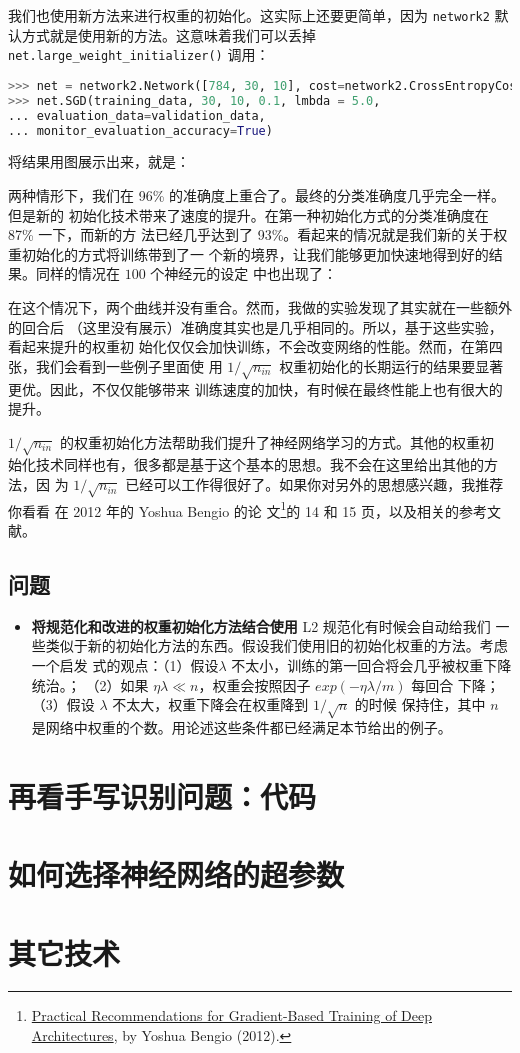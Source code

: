 我们也使用新方法来进行权重的初始化。这实际上还要更简单，因为 \lstinline!network2! 默认方式就是使用新的方法。这意味着我们可以丢掉 \lstinline!net.large_weight_initializer()! 调用：

\begin{lstlisting}[language=Python]
>>> net = network2.Network([784, 30, 10], cost=network2.CrossEntropyCost)
>>> net.SGD(training_data, 30, 10, 0.1, lmbda = 5.0,
... evaluation_data=validation_data, 
... monitor_evaluation_accuracy=True)
\end{lstlisting}

将结果用图展示出来，就是：

两种情形下，我们在 96\% 的准确度上重合了。最终的分类准确度几乎完全一样。但是新的
初始化技术带来了速度的提升。在第一种初始化方式的分类准确度在 87\% 一下，而新的方
法已经几乎达到了 93\%。看起来的情况就是我们新的关于权重初始化的方式将训练带到了一
个新的境界，让我们能够更加快速地得到好的结果。同样的情况在 $100$ 个神经元的设定
中也出现了：

在这个情况下，两个曲线并没有重合。然而，我做的实验发现了其实就在一些额外的回合后
（这里没有展示）准确度其实也是几乎相同的。所以，基于这些实验，看起来提升的权重初
始化仅仅会加快训练，不会改变网络的性能。然而，在第四张，我们会看到一些例子里面使
用 $1/\sqrt{n_{in}}$ 权重初始化的长期运行的结果要显著更优。因此，不仅仅能够带来
训练速度的加快，有时候在最终性能上也有很大的提升。

$1/\sqrt{n_{in}}$ 的权重初始化方法帮助我们提升了神经网络学习的方式。其他的权重初
始化技术同样也有，很多都是基于这个基本的思想。我不会在这里给出其他的方法，因
为 $1/\sqrt{n_{in}}$ 已经可以工作得很好了。如果你对另外的思想感兴趣，我推荐你看看
在 2012 年的 Yoshua Bengio 的论
文\footnote{\href{http://arxiv.org/pdf/1206.5533v2.pdf}{Practical
    Recommendations for Gradient-Based Training of Deep Architectures}, by
  Yoshua Bengio (2012).  }的 14 和 15 页，以及相关的参考文献。

\subsection*{问题}

\begin{itemize}
\item \textbf{将规范化和改进的权重初始化方法结合使用} L2 规范化有时候会自动给我们
  一些类似于新的初始化方法的东西。假设我们使用旧的初始化权重的方法。考虑一个启发
  式的观点：（1）假设$\lambda$ 不太小，训练的第一回合将会几乎被权重下降统治。；
  （2）如果 $\eta\lambda \ll n$，权重会按照因子 $exp(-\eta\lambda/m)$ 每回合
  下降；（3）假设 $\lambda$ 不太大，权重下降会在权重降到 $1/\sqrt{n}$ 的时候
  保持住，其中 $n$ 是网络中权重的个数。用论述这些条件都已经满足本节给出的例子。
\end{itemize}

\section{再看手写识别问题：代码}
\label{sec:handwriting_recognition_revisited_the_code}

\section{如何选择神经网络的超参数}
\label{sec:how_to_choose_a_neural_network's_hyper-parameters}

\section{其它技术}
\label{sec:other_techniques}
